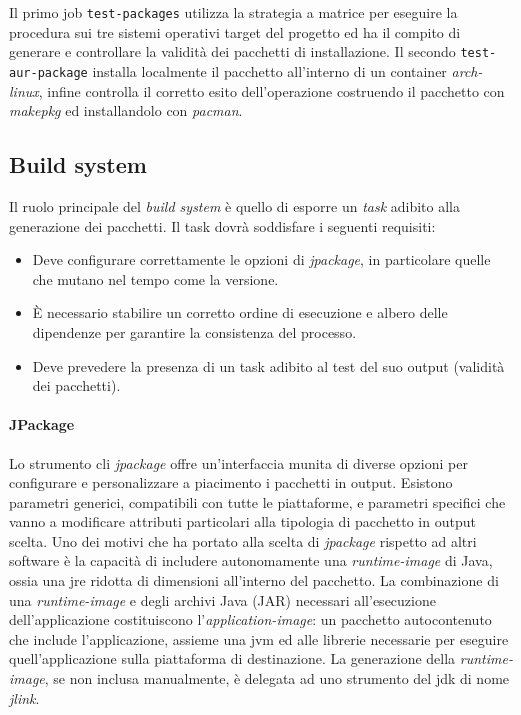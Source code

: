 Il primo job \texttt{test-packages} utilizza la strategia a matrice per eseguire la procedura sui tre sistemi operativi target del progetto ed ha il compito di generare e controllare la validità dei pacchetti di installazione. Il secondo \texttt{test-aur-package} installa localmente il pacchetto all'interno di un container \textit{arch-linux}, infine controlla il corretto esito dell'operazione costruendo il pacchetto con \textit{makepkg} ed installandolo con \textit{pacman}.

\subsection{Build system}

Il ruolo principale del \textit{build system} è quello di esporre un \textit{task} adibito alla generazione dei pacchetti. Il task dovrà soddisfare i seguenti requisiti:
\begin{itemize}
	\item Deve configurare correttamente le opzioni di \textit{jpackage}, in particolare quelle che mutano nel tempo come la versione.
	\item È necessario stabilire un corretto ordine di esecuzione e albero delle dipendenze per garantire la consistenza del processo.
	\item Deve prevedere la presenza di un task adibito al test del suo output (validità dei pacchetti).
\end{itemize}

\paragraph{JPackage} Lo strumento \ac{cli} \textit{jpackage} offre un'interfaccia munita di diverse opzioni per configurare e personalizzare a piacimento i pacchetti in output. Esistono parametri generici, compatibili con tutte le piattaforme, e parametri specifici che vanno a modificare attributi particolari alla tipologia di pacchetto in output scelta. Uno dei motivi che ha portato alla scelta di \textit{jpackage} rispetto ad altri software è la capacità di includere autonomamente una \textit{runtime-image} di Java, ossia una \ac{jre} ridotta di dimensioni all'interno del pacchetto. La combinazione di una \textit{runtime-image} e degli archivi Java (JAR) necessari all'esecuzione dell'applicazione costituiscono l'\textit{application-image}: un pacchetto autocontenuto che include l'applicazione, assieme una \ac{jvm} ed alle librerie necessarie per eseguire quell'applicazione sulla piattaforma di destinazione. La generazione della \textit{runtime-image}, se non inclusa manualmente, è delegata ad uno strumento del \ac{jdk} di nome \textit{jlink}. 

